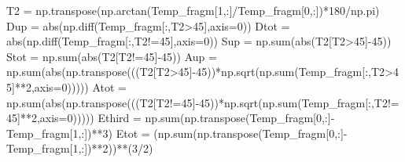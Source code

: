 \documentclass[
  letterpaper,
]{report}
\newenvironment{Shaded}{\begin{snugshade}}{\end{snugshade}}
\newcommand{\BuiltInTok}[1]{\textcolor[rgb]{0.00,0.23,0.31}{#1}}
\newcommand{\DecValTok}[1]{\textcolor[rgb]{0.68,0.00,0.00}{#1}}
\newcommand{\NormalTok}[1]{\textcolor[rgb]{0.00,0.23,0.31}{#1}}
\newcommand{\OperatorTok}[1]{\textcolor[rgb]{0.37,0.37,0.37}{#1}}
\begin{document}
\begin{Shaded}
\begin{Highlighting}[]
\NormalTok{    T2   }\OperatorTok{=}\NormalTok{ np.transpose(np.arctan(Temp\_fragm[}\DecValTok{1}\NormalTok{,:]}\OperatorTok{/}\NormalTok{Temp\_fragm[}\DecValTok{0}\NormalTok{,:])}\OperatorTok{*}\DecValTok{180}\OperatorTok{/}\NormalTok{np.pi)}
\NormalTok{    Dup  }\OperatorTok{=} \BuiltInTok{abs}\NormalTok{(np.diff(Temp\_fragm[:,T2}\OperatorTok{\textgreater{}}\DecValTok{45}\NormalTok{],axis}\OperatorTok{=}\DecValTok{0}\NormalTok{))}
\NormalTok{    Dtot }\OperatorTok{=} \BuiltInTok{abs}\NormalTok{(np.diff(Temp\_fragm[:,T2}\OperatorTok{!=}\DecValTok{45}\NormalTok{],axis}\OperatorTok{=}\DecValTok{0}\NormalTok{))}
\NormalTok{    Sup  }\OperatorTok{=}\NormalTok{ np.}\BuiltInTok{sum}\NormalTok{(}\BuiltInTok{abs}\NormalTok{(T2[T2}\OperatorTok{\textgreater{}}\DecValTok{45}\NormalTok{]}\OperatorTok{{-}}\DecValTok{45}\NormalTok{))}
\NormalTok{    Stot }\OperatorTok{=}\NormalTok{ np.}\BuiltInTok{sum}\NormalTok{(}\BuiltInTok{abs}\NormalTok{(T2[T2}\OperatorTok{!=}\DecValTok{45}\NormalTok{]}\OperatorTok{{-}}\DecValTok{45}\NormalTok{))}
\NormalTok{    Aup  }\OperatorTok{=}\NormalTok{ np.}\BuiltInTok{sum}\NormalTok{(}\BuiltInTok{abs}\NormalTok{(np.transpose(((T2[T2}\OperatorTok{\textgreater{}}\DecValTok{45}\NormalTok{]}\OperatorTok{{-}}\DecValTok{45}\NormalTok{))}\OperatorTok{*}\NormalTok{np.sqrt(np.}\BuiltInTok{sum}\NormalTok{(Temp\_fragm[:,T2}\OperatorTok{\textgreater{}}\DecValTok{45}\NormalTok{]}\OperatorTok{**}\DecValTok{2}\NormalTok{,axis}\OperatorTok{=}\DecValTok{0}\NormalTok{)))))}
\NormalTok{    Atot }\OperatorTok{=}\NormalTok{ np.}\BuiltInTok{sum}\NormalTok{(}\BuiltInTok{abs}\NormalTok{(np.transpose(((T2[T2}\OperatorTok{!=}\DecValTok{45}\NormalTok{]}\OperatorTok{{-}}\DecValTok{45}\NormalTok{))}\OperatorTok{*}\NormalTok{np.sqrt(np.}\BuiltInTok{sum}\NormalTok{(Temp\_fragm[:,T2}\OperatorTok{!=}\DecValTok{45}\NormalTok{]}\OperatorTok{**}\DecValTok{2}\NormalTok{,axis}\OperatorTok{=}\DecValTok{0}\NormalTok{)))))}
\NormalTok{    Ethird }\OperatorTok{=}\NormalTok{ np.}\BuiltInTok{sum}\NormalTok{(np.transpose(Temp\_fragm[}\DecValTok{0}\NormalTok{,:]}\OperatorTok{{-}}\NormalTok{Temp\_fragm[}\DecValTok{1}\NormalTok{,:])}\OperatorTok{**}\DecValTok{3}\NormalTok{)}
\NormalTok{    Etot }\OperatorTok{=}\NormalTok{ (np.}\BuiltInTok{sum}\NormalTok{(np.transpose(Temp\_fragm[}\DecValTok{0}\NormalTok{,:]}\OperatorTok{{-}}\NormalTok{Temp\_fragm[}\DecValTok{1}\NormalTok{,:])}\OperatorTok{**}\DecValTok{2}\NormalTok{))}\OperatorTok{**}\NormalTok{(}\DecValTok{3}\OperatorTok{/}\DecValTok{2}\NormalTok{)}


\end{Highlighting}
\end{Shaded}
\end{document}
